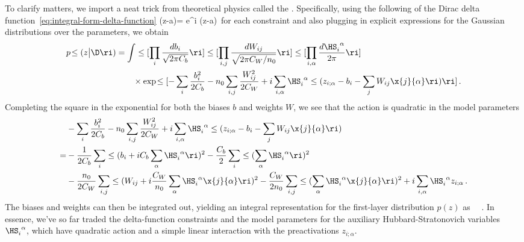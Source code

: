 To clarify matters, we import a neat trick from theoretical physics called
the .
Specifically, using the following  of the Dirac delta function~\eqref{eq:integral-form-delta-function}
\be\label{eq:integral-form-delta-function-reprint}
\delta(z-a)=\int {} e^{i \Lambda (z-a)}\,   
\ee
for each constraint and also plugging in explicit expressions for the Gaussian distributions over the parameters,  we obtain
\begin{align}
p\!\le(z\big\vert\D\ri)&= \int \le[\prod_{i} \frac{d b_{i}}{\sqrt{2\pi C_b}}\ri]  \le[\prod_{i,j} \frac{d W_{ij}}{\sqrt{2\pi C_W/n_0}} \ri]\le[\prod_{i,\alpha} \frac{d \HS_{i}^{\ \alpha}}{2\pi}\ri]\, \\
&\quad \quad \times\exp\!\le[-\sum_{i} \frac{b_i^2}{2C_b}-n_0\sum_{i,j} \frac{W_{ij}^2}{2C_W}+i\sum_{i,\alpha} \HS_{i}^{\ \alpha}\le(z_{i;\alpha}-b_i-\sum_{j}W_{ij}\x{j}{\alpha}\ri)\ri]\, .  \nonumber
\end{align}
Completing the square in the exponential for both the biases $b$ and weights $W$, we see that the action is quadratic in the model parameters
\begin{align}
&- \sum_{i}\frac{b_i^2}{2C_b}-n_0\sum_{i,j} \frac{W_{ij}^2}{2C_W}+i\sum_{i,\alpha} \HS_{i}^{\ \alpha}\le(z_{i;\alpha}-b_i-\sum_{j}W_{ij}\x{j}{\alpha}\ri)\, \\
=&-\frac{1}{2C_b}\sum_{i}\le(b_i+iC_b \sum_{\alpha}\HS_{i}^{\ \alpha}\ri)^2-\frac{C_b}{2}\sum_{i}\le(\sum_{\alpha}\HS_{i}^{\ \alpha}\ri)^2\, \nonumber\\
&- \frac{n_0}{2C_W}\sum_{i,j}\le(W_{ij}+i\frac{C_W}{n_0} \sum_{\alpha}\HS_{i}^{\ \alpha}\x{j}{\alpha}\ri)^2-\frac{C_W}{2n_0}\sum_{i,j}\le(\sum_{\alpha}\HS_{i}^{\ \alpha}\x{j}{\alpha}\ri)^2+i\sum_{i,\alpha} \HS_{i}^{\ \alpha} z_{i;\alpha}\, .\nonumber
\end{align}
The biases and weights can then be integrated out, yielding
an integral representation for the first-layer distribution $p(z)$ as
\be\label{eq:to-be-referenced-in-interlayer-part-far-ahead-in-the-future}
\int {}\ \exp\!\, .
\ee
In essence, we've so far traded the delta-function constraints and the model parameters for the auxiliary Hubbard-Stratonovich variables $\HS_{i}^{\ \alpha}$, which have quadratic action and a simple linear interaction with the preactivations $z_{i;\alpha}$.

